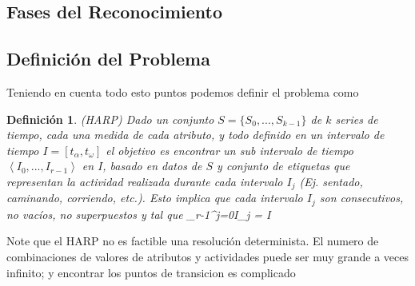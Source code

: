 \subsection{Fases del Reconocimiento}

\subsection{Definición del Problema}
Teniendo en cuenta todo esto puntos podemos definir el problema como 

\newtheorem{defi}{Definición}

\begin{defi}(HARP)
	Dado un conjunto $S = \{S_{0},...,S_{k-1}\} $ de $k$ series de tiempo, cada una medida de cada atributo, y todo definido en un intervalo de tiempo $I =  \left [ t_{\alpha}, t_{\omega} \right ]$ el objetivo es encontrar un sub intervalo de tiempo $\left\langle I_{0},...,I_{r-1} \right\rangle $ en $I$, basado en datos de $S$ y conjunto de etiquetas que representan la actividad realizada durante cada intervalo $I_{j}$ (Ej. sentado, caminando, corriendo, etc.). Esto implica que cada intervalo $I_{j}$ son consecutivos, no vacíos, no superpuestos y tal que \displaystyle\bigcup_{r-1}^{j=0}{I_j = I }
\end{defi}

Note que el HARP no es factible una resolución determinista. El numero de combinaciones de valores de atributos y actividades puede ser muy grande a veces infinito; y encontrar los puntos de transicion es complicado

